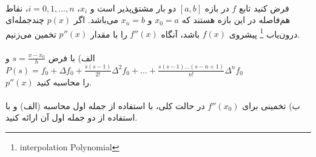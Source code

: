 \\
فرض کنید تابع \( f \) در بازه  \([a, b]\) دو بار مشتق‌پذیر است و \( x_i \)، \( i = 0, 1, \ldots , n\)، نقاط هم‌فاصله در این بازه‌ هستند که \( x_0 = a\) و \( x_n = b\) می‌باشد. اگر \( p(x) \) چندجمله‌ای درون‌یاب
\footnote{interpolation Polynomial}
پیشروی \( f(x) \) باشد، آنگاه \( f''(x) \) را با مقدار \( p''(x) \) تخمین می‌زنیم.
\\
\\
الف) با فرض
\( s = \frac{{x - x_0}}{{h}} \)
و
\( P(s) = f_0 + \Delta f_0 + \frac{{s(s - 1)}}{{2!}}\Delta^2 f_0 + \ldots + \frac{{s(s-1)\ldots(s-n+1)}}{{n!}}\Delta^n f_0 \)
\\
\(p''(x)\)
را محاسبه کنید.
\\
\\
ب) تخمینی برای \( f''(x_0) \) در حالت کلی، با استفاده از جمله اول محاسبه (الف) و با استفاده از دو جمله اول آن ارائه کنید.